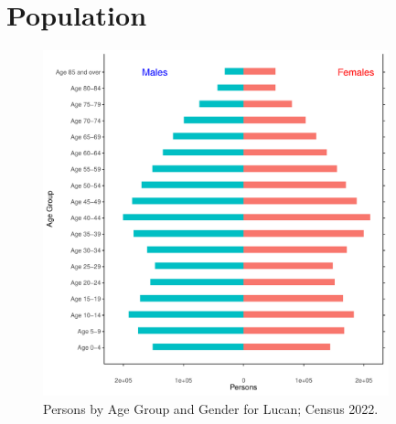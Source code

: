 \documentclass{article}
\begin{document}
\pagebreak

\section{Population} 
\label{sect:Pop}

\begin{figure}[h]
	\centering
	\includegraphics[width = 100mm]{../figures/PyramidPlot.pdf}
	\caption{Persons by Age Group and Gender for Lucan; Census 2022.}
	\label{fig:2ae19629-1a6a-13a3-e055-000000000001}
	\end{figure}
\end{document}
